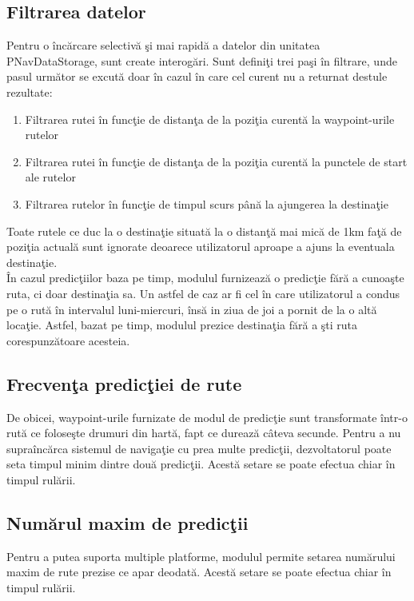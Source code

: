 	\subsection{Filtrarea datelor}
	Pentru o încărcare selectivă şi mai rapidă a datelor din unitatea PNavDataStorage, sunt create interogări. Sunt definiţi trei paşi în filtrare, unde pasul următor se excută doar în cazul în care cel curent nu a returnat destule rezultate:
		\begin{enumerate}
				 \setlength\itemsep{0em}
					\item Filtrarea rutei în funcţie de distanţa de la poziţia curentă la waypoint-urile rutelor
					\item Filtrarea rutei în funcţie de distanţa de la poziţia curentă la punctele de start ale rutelor
					\item Filtrarea rutelor în funcţie de timpul scurs până la ajungerea la destinaţie
		\end{enumerate}

	Toate rutele ce duc la o destinaţie situată la o distanţă mai mică de 1km faţă de poziţia actuală sunt ignorate deoarece utilizatorul aproape a ajuns la eventuala destinaţie.
	\vspace{6pt}
	\\În cazul predicţiilor baza pe timp, modulul furnizează o predicţie fără a cunoaşte ruta, ci doar destinaţia sa. Un astfel de caz ar fi cel în care utilizatorul a condus pe o rută în intervalul luni-miercuri, însă in ziua de joi a pornit de la o altă locaţie. Astfel, bazat pe timp, modulul prezice destinaţia fără a şti ruta corespunzătoare acesteia.
	
	
		\subsection{Frecvenţa predicţiei de rute}
		De obicei, waypoint-urile furnizate de modul de predicţie sunt transformate într-o rută ce foloseşte drumuri din hartă, fapt ce durează câteva secunde.
		Pentru a nu supraîncărca sistemul de navigaţie cu prea multe predicţii, dezvoltatorul poate seta timpul minim dintre două predicţii. Acestă setare se poate efectua chiar în timpul rulării.
		
		\subsection{Numărul maxim de predicţii}
		Pentru a putea suporta multiple platforme, modulul permite setarea numărului maxim de rute prezise ce apar deodată. Acestă setare se poate efectua chiar în timpul rulării.
		

